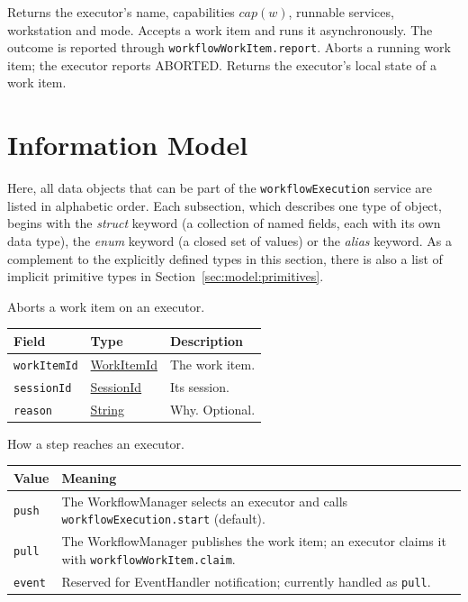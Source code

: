 \documentclass[a4paper]{arrowhead}
\newcommand{\pref}[1]{{\textcolor{ArrowheadGrey}{\hyperref[sec:model:primitives:#1]{#1}}}}
\begin{document}
Returns the executor's name, capabilities $cap(w)$, runnable services, workstation and mode.
Accepts a work item and runs it asynchronously. The outcome is reported through \texttt{workflowWorkItem.report}.
Aborts a running work item; the executor reports ABORTED.
Returns the executor's local state of a work item.

\newpage
\section{Information Model}
\label{sec:model}
Here, all data objects that can be part of the \texttt{workflowExecution} service are listed in alphabetic order. Each
subsection, which describes one type of object, begins with the \textit{struct} keyword (a collection of named fields,
each with its own data type), the \textit{enum} keyword (a closed set of values) or the \textit{alias} keyword. As a
complement to the explicitly defined types in this section, there is also a list of implicit primitive types in
Section~\ref{sec:model:primitives}.

Aborts a work item on an executor.

{\small
\begin{longtable}{|p{3.9cm}|p{4.4cm}|p{7.5cm}|}

\hline
\rowcolor{gray!33} Field & Type & Description \\ \hline
\endhead
\texttt{workItemId} & \pref{WorkItemId} & The work item. \\ \hline
\texttt{sessionId} & \pref{SessionId} & Its session. \\ \hline
\texttt{reason} & \pref{String} & Why. Optional. \\ \hline
\end{longtable}
}

How a step reaches an executor.

{\small
\begin{longtable}{|p{3.9cm}|p{11.9cm}|}

\hline
\rowcolor{gray!33} Value & Meaning \\ \hline
\endhead
\texttt{push} & The WorkflowManager selects an executor and calls \texttt{workflowExecution.start} (default). \\ \hline
\texttt{pull} & The WorkflowManager publishes the work item; an executor claims it with \texttt{workflowWorkItem.claim}. \\ \hline
\texttt{event} & Reserved for EventHandler notification; currently handled as \texttt{pull}. \\ \hline
\end{longtable}
}
\end{document}
